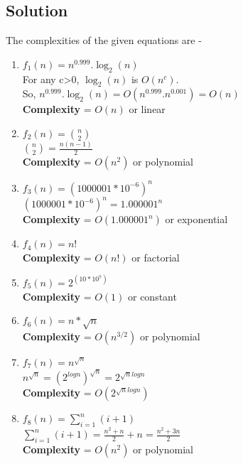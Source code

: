 \documentclass[12pt, a4paper]{article}
\begin{document}
\subsection{Solution}
The complexities of the given equations are -
\begin{enumerate}
    \item $f_1(n) = n^{0.999}.\log_2(n)$
    \\
    For any c>0, $\log_2(n)$ is $O(n^c)$. \\So, $n^{0.999}.\log_2(n) = O(n^{0.999} . n^{0.001}) = O(n)$
    \\
    \textbf{Complexity} = $O(n)$ or linear
    \item $f_2(n) = \binom{n}{2}$
    \\
    $\binom{n}{2} = \frac{n(n-1)}{2} $
    \\
    \textbf{Complexity} = $O(n^2)$ or polynomial
    \item $f_3(n) = (1000001 * 10^{-6})^{n}$
    \\
    $(1000001 * 10^{-6})^{n} = 1.000001^{n}$
    \\
    \textbf{Complexity} = $O(1.000001^{n})$ or exponential
    \item $f_4(n) = n!$
    \\
    \textbf{Complexity} = $O(n!)$ or factorial
    \item $f_5(n) = 2^{(10*10^{7})}$
    \\
    \textbf{Complexity} = $O(1)$ or constant
    \item $f_6(n) = n*\sqrt{n}$ 
    \\
    \textbf{Complexity} = $O(n^{3/2})$ or polynomial
    \item $f_7(n) = n^{\sqrt{n}}$
    \\
    $n^{\sqrt{n}} = (2^{logn})^{\sqrt{n}} = 2^{\sqrt{n}logn} $
    \\
    \textbf{Complexity} = $O(2^{\sqrt{n}logn})$
    \item $f_8(n) = \sum_{i=1}^{n} (i+1)$ 
    \\
    $\sum_{i=1}^{n} (i+1) = \frac{n^2 + n}{2} + n = \frac{n^2 + 3n}{2}$
    \\
    \textbf{Complexity} = $O(n^2)$ or polynomial
\end{enumerate}
\newpage
\end{document}
